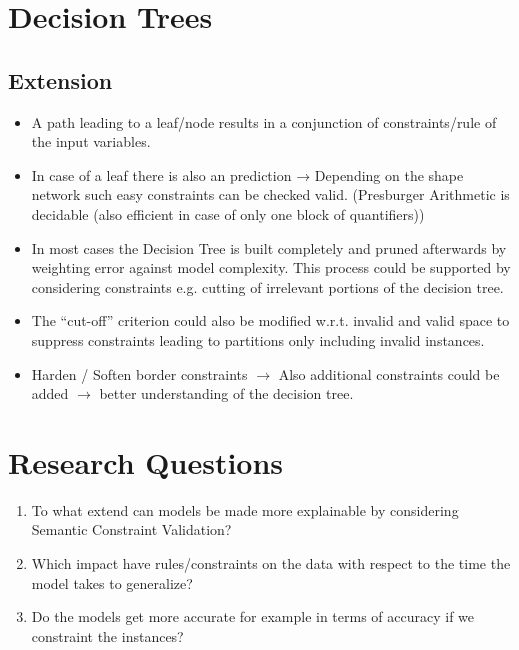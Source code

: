 \documentclass[../../thesis]{subfiles}
\begin{document}
\section{Decision Trees}



\subsection{Extension}
\begin{itemize}
    \item A path leading to a leaf/node results in a conjunction of constraints/rule of the input variables.
    \item In case of a leaf there is also an prediction → Depending on the shape network such easy constraints can be checked valid. (Presburger Arithmetic is decidable (also efficient in case of only one block of quantifiers))
    \item In most cases the Decision Tree is built completely and pruned afterwards by weighting error against model complexity. This process could be supported by considering constraints e.g. cutting of irrelevant portions of the decision tree.
    \item The “cut-off” criterion could also be modified w.r.t. invalid and valid space to suppress constraints leading to partitions only including invalid instances.
    \item Harden / Soften border constraints $\rightarrow$ Also additional constraints could be added $\rightarrow$ better understanding of the decision tree.
\end{itemize}

\section{Research Questions}
\begin{enumerate}
    \item To what extend can models be made more explainable by considering Semantic Constraint Validation?
    \item Which impact have rules/constraints on the data with respect to the time the model takes to generalize?
    \item Do the models get more accurate for example in terms of accuracy if we constraint the instances?
\end{enumerate}

\newpage
\end{document}
